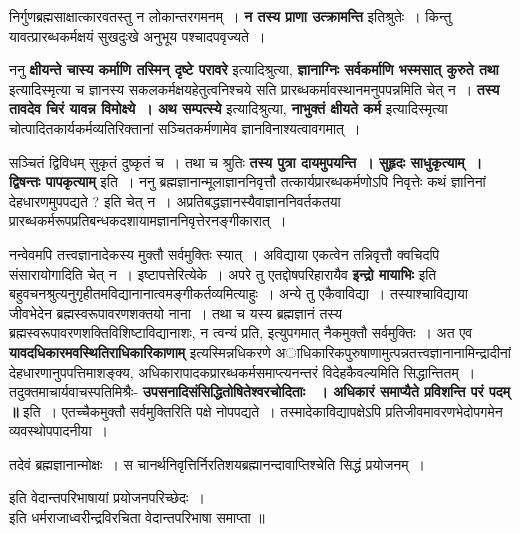 	निर्गुणब्रह्मसाक्षात्कारवतस्तु न लोकान्तरगमनम्~। {\bfseries न तस्य प्राणा उत्क्रामन्ति} इतिश्रुतेः~। किन्तु यावत्प्रारब्धकर्मक्षयं सुखदुःखे अनुभूय पश्चादपवृज्यते~।\par
	ननु {\bfseries क्षीयन्ते चास्य कर्माणि तस्मिन् दृष्टे परावरे} इत्यादिश्रुत्या, {\bfseries ज्ञानाग्निः सर्वकर्माणि भस्मसात् कुरुते तथा} इत्यादिस्मृत्या च ज्ञानस्य सकलकर्मक्षयहेतुत्वनिश्चये सति प्रारब्धकर्मावस्थानमनुपपन्नमिति चेत् न~। {\bfseries तस्य तावदेव चिरं यावन्न विमोक्ष्ये~। अथ सम्पत्स्ये} इत्यादिश्रुत्या, {\bfseries नाभुक्तं क्षीयते कर्म} इत्यादिस्मृत्या चोत्पादितकार्यकर्मव्यतिरिक्तानां सञ्चितकर्मणामेव ज्ञानविनाश्यत्वावगमात्~।\par
	सञ्चितं द्विविधम् सुकृतं दुष्कृतं च~। तथा च श्रुतिः {\bfseries तस्य पुत्रा दायमुपयन्ति~। सुहृदः साधुकृत्याम्~। द्विषन्तः पापकृत्याम्} इति~। ननु ब्रह्मज्ञानान्मूलाज्ञाननिवृत्तौ तत्कार्यप्रारब्धकर्मणोऽपि निवृत्तेः कथं ज्ञानिनां देहधारणमुपपद्यते ? इति चेत् न~। अप्रतिबद्धज्ञानस्यैवाज्ञाननिवर्तकतया प्रारब्धकर्मरूपप्रतिबन्धकदशायामज्ञाननिवृत्तेरनङ्गीकारात्~।\par
	नन्वेवमपि तत्त्वज्ञानादेकस्य मुक्तौ सर्वमुक्तिः स्यात्~। अविद्याया एकत्वेन तन्निवृत्तौ क्वचिदपि संसारायोगादिति चेत् न~। इष्टापत्तेरित्येके~। अपरे तु एतद्दोषपरिहारायैव {\bfseries इन्द्रो मायाभिः} इति बहुवचनश्रुत्यनुगृहीतमविद्यानानात्वमङ्गीकर्तव्यमित्याहुः~। अन्ये तु एकैवाविद्या~। तस्याश्चाविद्याया जीवभेदेन ब्रह्मस्वरूपावरणशक्तयो नाना~। तथा च यस्य ब्रह्मज्ञानं तस्य ब्रह्मस्वरूपावरणशक्तिविशिष्टाविद्यानाशः, न त्वन्यं प्रति, इत्युपगमात् नैकमुक्तौ सर्वमुक्तिः~। अत एव {\bfseries यावदधिकारमवस्थितिराधिकारिकाणाम्} इत्यस्मिन्नधिकरणे अाधिकारिकपुरुषाणामुत्पन्नतत्त्वज्ञानानामिन्द्रादीनां देहधारणानुपपत्तिमाशङ्क्य, अधिकारापादकप्रारब्धकर्मसमाप्त्यनन्तरं विदेहकैवल्यमिति सिद्धान्तितम्~। तदुक्तमाचार्यवाचस्पतिमिश्रैः- {\bfseries उपसनादिसंसिद्धितोषितेश्वरचोदिताः~
	। अधिकारं समाप्यैते प्रविशन्ति परं पदम् ॥} इति~। एतच्चैकमुक्तौ सर्वमुक्तिरिति पक्षे नोपपद्यते~। तस्मादेकाविद्यापक्षेऽपि प्रतिजीवमावरणभेदोपगमेन व्यवस्थोपपादनीया~।\par
	तदेवं ब्रह्मज्ञानान्मोक्षः~। स चानर्थनिवृत्तिर्निरतिशयब्रह्मानन्दावाप्तिश्चेति सिद्धं प्रयोजनम्~।\par
	\begin{center} इति वेदान्तपरिभाषायां प्रयोजनपरिच्छेदः~। \\ इति धर्मराजाध्वरीन्द्रविरचिता वेदान्तपरिभाषा समाप्ता ॥\end{center} 
